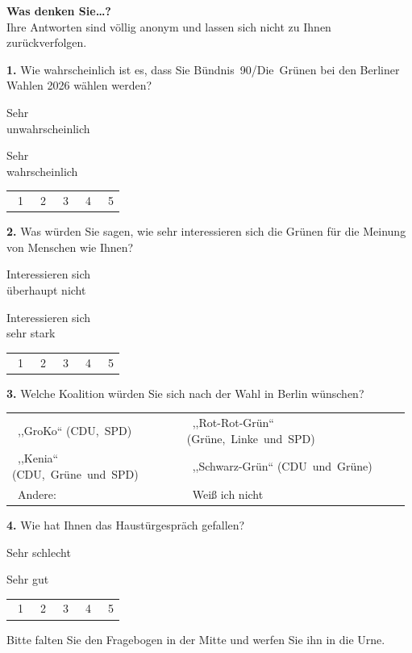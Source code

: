 \documentclass[10pt]{article}
\makeatletter
\newcommand{\fragebox}[1]{\begin{tcolorbox}#1\end{tcolorbox}}
\newcommand{\boxsize}{3.6mm}
\newcommand{\ckbox}{\raisebox{-0.2em}{\tikz{\draw[line width=0.5pt] (0,0) rectangle (\boxsize,\boxsize);}}}
\newcommand{\likertrow}[2]{%
  \par\vspace{8pt}
  \noindent
  \parbox[b]{0.30\linewidth}{\raggedright\small #1}%
  \hfill
  \parbox[b]{0.30\linewidth}{\raggedleft\small #2}%
  \par\vspace{2pt}
  \begin{tabular*}{\linewidth}{@{\extracolsep{\fill}}ccccc}
    \ckbox~1 & \ckbox~2 & \ckbox~3 & \ckbox~4 & \ckbox~5
  \end{tabular*}%
}
\makeatother
\begin{document}
\begin{center}
    {\Large\bfseries Was denken Sie\dots?}\\[1.5mm]
    {\normalsize Ihre Antworten sind völlig anonym und lassen sich nicht zu Ihnen zurückverfolgen.}
\end{center}

\vspace{9mm}

\fragebox{
    \textbf{1.} Wie wahrscheinlich ist es, dass Sie Bündnis~90/Die~Grünen bei den Berliner Wahlen 2026 wählen werden?

    \likertrow{Sehr\\unwahrscheinlich}{Sehr\\wahrscheinlich}
}

\fragebox{
    \textbf{2.} Was würden Sie sagen, wie sehr interessieren sich die Grünen für die Meinung von Menschen wie Ihnen?

    \likertrow{Interessieren sich\\überhaupt nicht}{Interessieren sich\\sehr stark}
}

\vspace{20mm}

\fragebox{
    \textbf{3.} Welche Koalition würden Sie sich nach der Wahl in Berlin wünschen?

    \vspace{4pt}
    \setlength{\tabcolsep}{2pt}%
    \begin{tabular}{@{}>{\raggedright\arraybackslash}p{0.43\linewidth} >{\raggedright\arraybackslash}p{0.55\linewidth}@{}}
        \ckbox~,,GroKo`` \mbox{\footnotesize(CDU, SPD)}           & \ckbox~,,Rot-Rot-Grün`` \mbox{\footnotesize(Grüne, Linke und SPD)} \\[4pt]
        \ckbox~,,Kenia`` \mbox{\footnotesize(CDU, Grüne und SPD)} & \ckbox~,,Schwarz-Grün`` \mbox{\footnotesize(CDU und Grüne)}        \\[4pt]
        \ckbox~Andere: \makebox[2.2cm]{\hrulefill}               & \ckbox~Weiß ich nicht                                             \\
    \end{tabular}
}

\fragebox{
    \textbf{4.} Wie hat Ihnen das Haustürgespräch gefallen?

    \likertrow{Sehr schlecht}{Sehr gut}
}

\vspace{3mm}
\begin{center}
    {\small Bitte falten Sie den Fragebogen in der Mitte und werfen Sie ihn in die Urne.}
\end{center}
\end{document}
